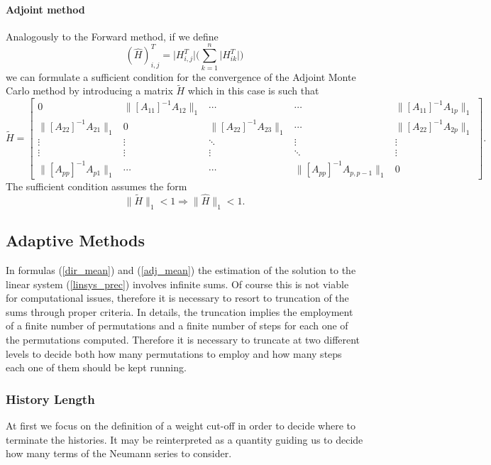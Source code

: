 \documentclass[a4paper,10pt]{article}
\begin{document}
\paragraph{Adjoint method}
Analogously to the Forward method, if we define
\[
(\hat{H})^T_{i,j} = \lvert H^T_{i,j}\rvert\bigg(\sum_{k=1}^n\lvert
H^T_{ik}\rvert\bigg)
\]
we can formulate a sufficient condition for the convergence of the Adjoint
Monte
Carlo method by introducing a matrix $\tilde{H}$ which in this case is such that
\[
  \tilde{H}=\begin{bmatrix}0 & \lVert [A_{11}]^{-1}A_{12}\rVert_{1} & \cdots
&
\cdots & \lVert [A_{11}]^{-1}A_{1p}\rVert_{1} \\
\lVert [A_{22}]^{-1}A_{21}\rVert_{1} & 0 & \lVert
[A_{22}]^{-1}A_{23}\rVert_{1} &
\cdots & \lVert [A_{22}]^{-1}A_{2p}\rVert_{1} \\
\vdots & \vdots & \ddots & \vdots & \vdots\\
\vdots & \vdots & \vdots &\ddots & \vdots \\
\lVert [A_{pp}]^{-1}A_{p1}\rVert_{1} &  \cdots & \cdots&
\lVert [A_{pp}]^{-1}A_{p,p-1}\rVert_{1} & 0
\end{bmatrix}.
\]
The sufficient condition assumes the form
\begin{equation}
 \lVert \tilde{H} \rVert_{1}<1 \Rightarrow \lVert \hat{H} \rVert_{1}<1.
\end{equation}

\subsection{Adaptive Methods}

In formulas (\ref{dir_mean}) and (\ref{adj_mean}) the estimation of the
solution to
the linear system (\ref{linsys_prec}) involves infinite sums. Of course this is
not viable for
computational issues, therefore it is necessary to resort to truncation of
the sums through proper criteria. In details, the truncation implies the
employment of a finite number of permutations and a finite number of
steps for each one of the permutations computed. Therefore it is necessary to
truncate at two different levels to decide both how many permutations to employ
and how many steps each one of them should be kept running.

\subsubsection{History Length}

At first we focus on the definition of a weight cut-off
in order to decide where to terminate the histories. It may be reinterpreted as
a quantity guiding us to decide how many terms of the Neumann
series to consider. \newline
\end{document}
